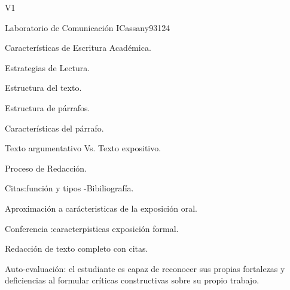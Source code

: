 \begin{syllabus}
\begin{competences}{V1}
    \item {}
    \item {}
    \item {}
\end{competences}

\begin{unit}{Laboratorio de Comunicación I}{}{Cassany93}{12}{4}
   \begin{topics}
      \item Características de Escritura Académica.
      \item Estrategias de Lectura.
      \item Estructura del texto.
      \item Estructura de párrafos.
      \item Características del párrafo.
      \item Texto argumentativo Vs. Texto expositivo.
      \item Proceso de Redacción.
      \item Citas:función y tipos -Bibiliografía.
      \item Aproximación a carácteristicas de la exposición oral.
      \item Conferencia :caracterpisticas exposición formal.
      \item Redacción de texto completo con citas.  
   \end{topics}
   \begin{learningoutcomes}
      \item Auto-evaluación: el estudiante es capaz de reconocer sus propias fortalezas y deficiencias al formular críticas constructivas sobre su propio trabajo.
   \end{learningoutcomes}
\end{unit}

\begin{coursebibliography}
\end{coursebibliography}

\end{syllabus}
